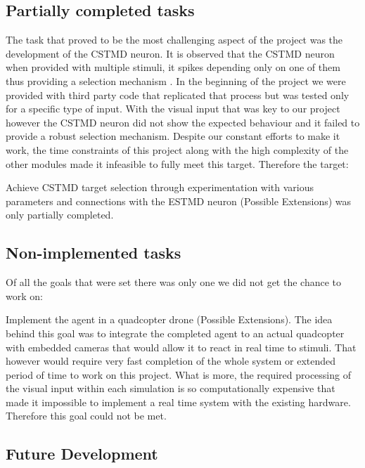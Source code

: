 \documentclass[a4paper,11pt]{article}
\begin{document}
\subsection{Partially completed tasks}

The task that proved to be the most challenging aspect of the project was the development of the 
CSTMD neuron. It is observed that the CSTMD neuron when provided with multiple stimuli, it spikes 
depending only on one of them thus providing a selection mechanism \cite{?}. In the beginning of 
the project we were provided with third party code that replicated that process but was tested only 
for a specific type of input. With the visual input that was key to our project however the CSTMD 
neuron did not show the expected behaviour and it failed to provide a robust selection mechanism. 
Despite our constant efforts to make it work, the time constraints of this project along with the high 
complexity of the other modules made it infeasible to fully meet this target. Therefore the target:\\

\noindent

Achieve CSTMD target selection through experimentation with various parameters and connections 
with the ESTMD neuron (Possible Extensions)
was only partially completed.

\subsection{Non-implemented tasks}

Of all the goals that were set there was only one we did not get the chance to work on:

\noindent
Implement the agent in a quadcopter drone (Possible Extensions).
The idea behind this goal was to integrate the completed agent to an actual quadcopter with 
embedded cameras that would allow it to react in real time to stimuli. That however would require
very fast completion of the whole system or extended period of time to work on this project. What is 
more, the required processing of the visual input within each simulation is so computationally 
expensive that made it impossible to implement a real time system with the existing hardware. 
Therefore this goal could not be met.

\subsection{Future Development}
\end{document}
